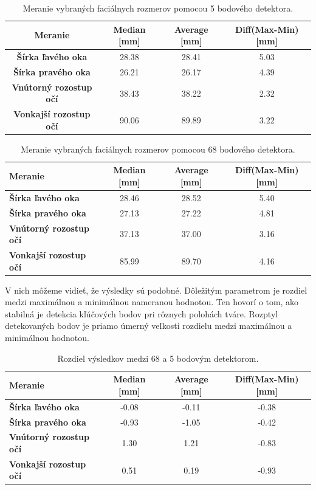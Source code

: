 \begin{table}[h]
	\caption{\label{tab:dlib:5points} Meranie vybraných faciálnych rozmerov pomocou 5 bodového detektora.}
	\centering
	\begin{tabular}{cccc}
		\toprule
		\textbf{Meranie} & \textbf{Median [mm]} & \textbf{Average [mm]} & \textbf{Diff(Max-Min) [mm]} \\ 
		\midrule
		\textbf{Šírka ľavého oka} 	& 28.38 & 28.41	& 5.03 \\
		\textbf{Šírka pravého oka} 	& 26.21	& 26.17 & 4.39 \\
		\textbf{Vnútorný rozostup očí} 	& 38.43	& 38.22 & 2.32 \\
		\textbf{Vonkajší rozostup očí} 	& 90.06	& 89.89 & 3.22 \\
		\bottomrule
	\end{tabular}
\end{table}

\begin{table}[h]
	\caption{\label{tab:dlib:68points} Meranie vybraných faciálnych rozmerov pomocou 68 bodového detektora.}
	\centering
	\begin{tabular}{lccc}
		\toprule
		\textbf{Meranie} & \textbf{Median [mm]} & \textbf{Average [mm]} & \textbf{Diff(Max-Min) [mm]} \\ 
		\midrule
		\textbf{Šírka ľavého oka} 	& 28.46 & 28.52	& 5.40 \\
		\textbf{Šírka pravého oka} 	& 27.13	& 27.22 & 4.81 \\
		\textbf{Vnútorný rozostup očí} 	& 37.13	& 37.00 & 3.16 \\
		\textbf{Vonkajší rozostup očí} 	& 85.99	& 89.70 & 4.16 \\
		\bottomrule
	\end{tabular}
\end{table}

V nich môžeme vidieť, že výsledky sú podobné. Dôležitým parametrom je rozdiel medzi maximálnou a minimálnou nameranou hodnotou. Ten hovorí o tom, ako stabilná je detekcia kľúčových bodov pri rôznych polohách tváre. Rozptyl detekovaných bodov je priamo úmerný veľkosti rozdielu medzi maximálnou a minimálnou hodnotou.

\begin{table}[H]
	\caption{\label{tab:dlib:resulrs} Rozdiel výsledkov medzi 68 a 5 bodovým detektorom.}
	\centering
	\begin{tabular}{lccc}
		\toprule
		\textbf{Meranie} & \textbf{Median [mm]} & \textbf{Average [mm]} & \textbf{Diff(Max-Min) [mm]} \\ 
		\midrule
		\textbf{Šírka ľavého oka} 	& -0.08 & -0.11	& -0.38 \\
		\textbf{Šírka pravého oka} 	& -0.93	& -1.05 & -0.42 \\
		\textbf{Vnútorný rozostup očí} 	& 1.30	& 1.21 & -0.83 \\
		\textbf{Vonkajší rozostup očí} 	& 0.51	& 0.19 & -0.93 \\
		\bottomrule
	\end{tabular}
\end{table}

